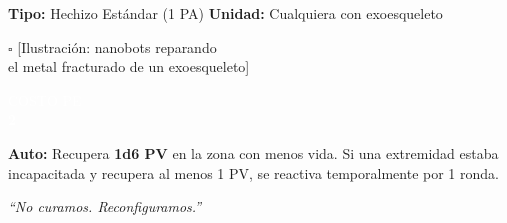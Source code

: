 \begin{center}
\begin{tcbitemize}
\tcbitem[title={\textbf{AUTORREPARACIÓN} \hfill \textcolor{white}{\small Soporte}}]

    {\fontsize{6.5}{7}\selectfont
    \textbf{Tipo:} Hechizo Estándar (1 PA) \hfill \textbf{Unidad:} Cualquiera con exoesqueleto}
    \vspace{2pt}

    \begin{tcolorbox}[colback=ChromeGray!15, colframe=ChromeGray!40, height=2.5cm,
                      halign=center, valign=center, sharp corners, size=small, nobeforeafter]
        \textcolor{ChromeGray}{\fontsize{7}{8}\selectfont $\square$ [Ilustración: nanobots reparando\\ el metal fracturado de un exoesqueleto]}
    \end{tcolorbox}

    \vfill

    \noindent
    \begin{minipage}[b]{0.22\linewidth}
        \begin{tcolorbox}[colback=BloodPurple, colframe=VoidBlack, sharp corners,
                          halign=center, valign=center, boxsep=0pt,
                          left=0pt, right=0pt, top=0pt, bottom=0pt,
                          nobeforeafter, height=1.9cm]
            \textcolor{white}{\fontsize{5.5}{6}\selectfont COSTO PE\\[3pt] \Large \textbf{2}}
        \end{tcolorbox}
    \end{minipage}%
    \hfill
    \begin{minipage}[b]{0.75\linewidth}
        \begin{tcolorbox}[colback=white, colframe=VoidPurple, sharp corners, boxrule=0.5pt,
                          left=2pt, right=2pt, top=2pt, bottom=2pt,
                          nobeforeafter, height=1.4cm]
            \fontsize{6}{7}\selectfont
            \textbf{Auto:} Recupera \textbf{1d6 PV} en la zona con menos vida. Si una extremidad estaba incapacitada y recupera al menos 1 PV, se reactiva temporalmente por 1 ronda.
        \end{tcolorbox}
        \vspace{2pt}
        \begin{center}
            \fontsize{5.5}{6}\selectfont \itshape
            \textcolor{VoidPurple}{``No curamos. Reconfiguramos.''}
        \end{center}
    \end{minipage}



\end{tcbitemize}
\end{center}
